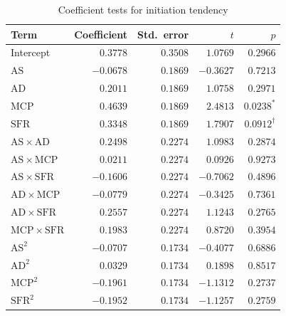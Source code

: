 \documentclass[12pt]{article}
\begin{document}
\begin{table}[htbp]
\centering
\small
\caption{Coefficient tests for initiation tendency}
\label{tab:coef-initiation}
\begin{tabular}{lrrrr}
\toprule
Term & Coefficient & Std.\ error & $t$ & $p$ \\
\midrule
Intercept                         & $ 0.3778$ & $0.3508$ & $ 1.0769$ & $0.2966$ \\
$\mathrm{AS}$                     & $-0.0678$ & $0.1869$ & $-0.3627$ & $0.7213$ \\
$\mathrm{AD}$                     & $ 0.2011$ & $0.1869$ & $ 1.0758$ & $0.2971$ \\
$\mathrm{MCP}$                    & $ 0.4639$ & $0.1869$ & $ 2.4813$ & $0.0238^{*}$ \\
$\mathrm{SFR}$                    & $ 0.3348$ & $0.1869$ & $ 1.7907$ & $0.0912^{\dagger}$ \\
$\mathrm{AS}\times\mathrm{AD}$    & $ 0.2498$ & $0.2274$ & $ 1.0983$ & $0.2874$ \\
$\mathrm{AS}\times\mathrm{MCP}$   & $ 0.0211$ & $0.2274$ & $ 0.0926$ & $0.9273$ \\
$\mathrm{AS}\times\mathrm{SFR}$   & $-0.1606$ & $0.2274$ & $-0.7062$ & $0.4896$ \\
$\mathrm{AD}\times\mathrm{MCP}$   & $-0.0779$ & $0.2274$ & $-0.3425$ & $0.7361$ \\
$\mathrm{AD}\times\mathrm{SFR}$   & $ 0.2557$ & $0.2274$ & $ 1.1243$ & $0.2765$ \\
$\mathrm{MCP}\times\mathrm{SFR}$  & $ 0.1983$ & $0.2274$ & $ 0.8720$ & $0.3954$ \\
$\mathrm{AS}^{2}$                 & $-0.0707$ & $0.1734$ & $-0.4077$ & $0.6886$ \\
$\mathrm{AD}^{2}$                 & $ 0.0329$ & $0.1734$ & $ 0.1898$ & $0.8517$ \\
$\mathrm{MCP}^{2}$                & $-0.1961$ & $0.1734$ & $-1.1312$ & $0.2737$ \\
$\mathrm{SFR}^{2}$                & $-0.1952$ & $0.1734$ & $-1.1257$ & $0.2759$ \\
\bottomrule

\end{tabular}
\end{table}
\end{document}
